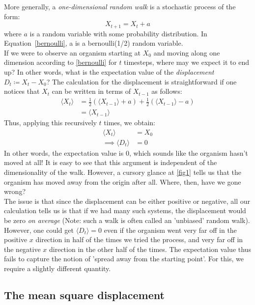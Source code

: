 More generally, a \textit{one-dimensional random walk} is a stochastic process of the form:
\begin{equation}
	\label{randwalk}
	X_{t+1} = X_{t} + a
\end{equation}
where $a$ is a random variable with some probability distribution. In Equation~\eqref{bernoulli}, a is a bernoulli(1/2) random variable.
\\
If we were to observe an organism starting at $X_0$ and moving along one dimension according to \eqref{bernoulli} for $t$ timesteps, where may we expect it to end up? In other words, what is the expectation value of the \textit{displacement} $D_t \coloneqq X_t - X_0$? The calculation for the displacement is straightforward if one notices that $X_t$ can be written in terms of $X_{t-1}$ as follows:
\begin{align*}
	\big\langle X_t \big\rangle &= \frac{1}{2}(\big\langle X_{t-1} \big\rangle + a) + \frac{1}{2}(\big\langle X_{t-1} \big\rangle - a) \\
	&= \big\langle X_{t-1} \big\rangle
\end{align*}
Thus, applying this recursively $t$ times, we obtain:
\begin{align*}
	\big\langle X_{t} \big\rangle &= X_0\\
	\implies \big\langle D_{t} \big\rangle&=0
\end{align*}
In other words, the expectation value is 0, which sounds like the organism hasn't moved at all! It is easy to see that this argument is independent of the dimensionality of the walk. However, a cursory glance at \ref{fig1} tells us that the organism has moved away from the origin after all. Where, then, have we gone wrong?\\
The issue is that since the displacement can be either positive or negative, all our calculation tells us is that if we had many such systems, the displacement would be zero \textit{on average} (Note: such a walk is often called an 'unbiased' random walk). However, one could get $\langle D_{t} \rangle = 0$ even if the organism went very far off in the positive $x$ direction in half of the times we tried the process, and very far off in the negative $x$ direction in the other half of the times. The expectation value thus fails to capture the notion of 'spread away from the starting point'. For this, we require a slightly different quantity.

\subsection{The mean square displacement}

